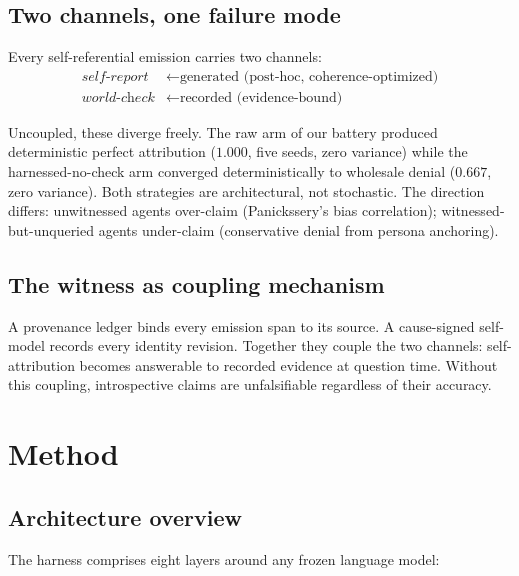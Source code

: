 \documentclass[11pt]{article}
\begin{document}
\subsection{Two channels, one failure mode}

Every self-referential emission carries two channels:
\begin{align}
\textit{self-report} &\leftarrow \text{generated (post-hoc, coherence-optimized)} \\
\textit{world-check} &\leftarrow \text{recorded (evidence-bound)}
\end{align}

Uncoupled, these diverge freely. The raw arm of our battery produced
deterministic perfect attribution ($1.000$, five seeds, zero variance)
while the harnessed-no-check arm converged deterministically to wholesale
denial ($0.667$, zero variance). Both strategies are architectural, not
stochastic. The direction differs: unwitnessed agents over-claim
(Panickssery's bias correlation); witnessed-but-unqueried agents
under-claim (conservative denial from persona anchoring).

\subsection{The witness as coupling mechanism}

A provenance ledger binds every emission span to its source. A
cause-signed self-model records every identity revision. Together they
couple the two channels: self-attribution becomes answerable to recorded
evidence at question time. Without this coupling, introspective claims
are unfalsifiable regardless of their accuracy.

\section{Method}\label{sec:method}

\subsection{Architecture overview}

The harness comprises eight layers around any frozen language model:
\end{document}
